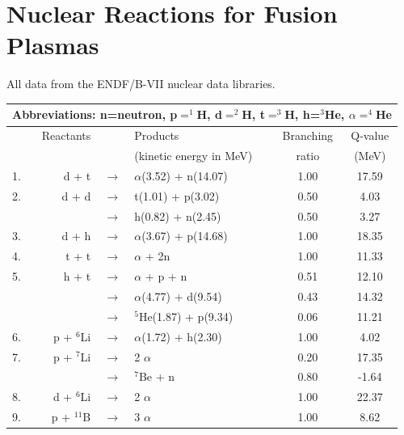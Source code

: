 {\section{Nuclear Reactions for Fusion Plasmas}
\noindent
All data from the ENDF/B-VII nuclear data libraries.\cite{chadwick}
\begin{table}[h!]\small
  \centering
  \begin{tabular}{l r c l c c}
    \multicolumn{6}{c}{Abbreviations: n=neutron, p$=^1$H, d$=^2$H, t$=^3$H, h=$^3$He, $\alpha=^4$He}\\
    \hline
    & Reactants \T & & Products & Branching & Q-value \\[5pt]
    &           \B & & (kinetic energy in MeV) & ratio & (MeV) \\[5pt]
    \hline\hline
    1.\T & d + t        & $\longrightarrow$ & $\alpha$(3.52) + n(14.07) & 1.00  & 17.59 \\[5pt]
    2.   & d + d        & $\longrightarrow$ & t(1.01) + p(3.02)         & 0.50  &  4.03 \\[5pt]
         &              & $\longrightarrow$ & h(0.82) + n(2.45)         & 0.50  &  3.27 \\[5pt]
    3.   & d + h        & $\longrightarrow$ & $\alpha$(3.67) + p(14.68) & 1.00  & 18.35 \\[5pt]
    4.   & t + t        & $\longrightarrow$ & $\alpha$ + 2n             & 1.00  & 11.33 \\[5pt]
    5.   & h + t        & $\longrightarrow$ & $\alpha$ + p + n          & 0.51  & 12.10 \\[5pt]
         &              & $\longrightarrow$ & $\alpha$(4.77) + d(9.54)  & 0.43  & 14.32 \\[5pt]
         &              & $\longrightarrow$ & $^5$He(1.87) + p(9.34)    & 0.06  & 11.21 \\[5pt]
    6.   & p + $^6$Li   & $\longrightarrow$ & $\alpha$(1.72) + h(2.30)  & 1.00  &  4.02 \\[5pt]
    7.   & p + $^7$Li   & $\longrightarrow$ & 2 $\alpha$                & 0.20  & 17.35 \\[5pt]
         &              & $\longrightarrow$ & $^7$Be + n                & 0.80  & -1.64 \\[5pt]
    8.   & d + $^6$Li   & $\longrightarrow$ & 2 $\alpha$                & 1.00  & 22.37 \\[5pt]
    9.\B & p + $^{11}$B & $\longrightarrow$ & 3 $\alpha$                & 1.00  &  8.62 \\[5pt]
    \hline
  \end{tabular}
  \label{plasmaReactions}
\end{table}

}
